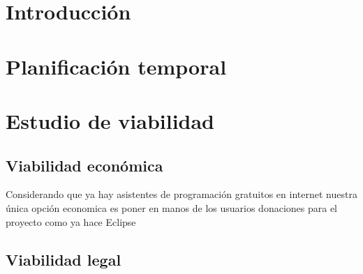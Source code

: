 
\section{Introducción}

\section{Planificación temporal}

\section{Estudio de viabilidad}

\subsection{Viabilidad económica}

Considerando que ya hay asistentes de programación gratuitos en internet nuestra única opción economica es poner en manos de los usuarios donaciones para el proyecto como ya hace Eclipse

\subsection{Viabilidad legal}


